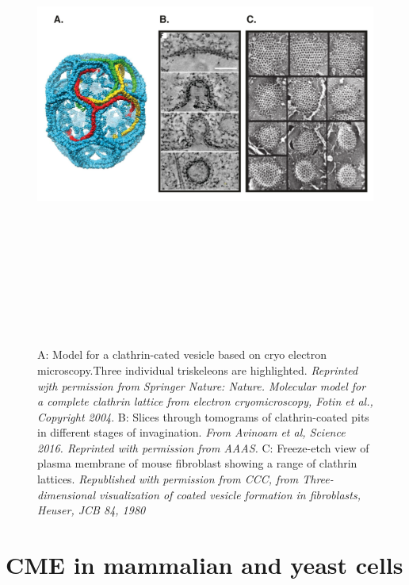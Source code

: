 \begin{figure}[H]
\centering
	\includegraphics[width=13cm, height=16cm, keepaspectratio]{figures/intro/clathrin2}
	\caption[Endocytic pathways in cells]
	{ A: Model for a clathrin-cated vesicle based on cryo electron microscopy.Three individual triskeleons are highlighted. \textit{Reprinted wjth permission from Springer Nature: Nature. Molecular model for a complete clathrin lattice from electron cryomicroscopy,  Fotin et al., Copyright 2004}.
		B:   Slices through tomograms of clathrin-coated pits in different stages of invagination. \textit{From Avinoam et al, Science 2016. Reprinted with permission from AAAS.}
		C: Freeze-etch view of plasma membrane of mouse fibroblast showing a range of clathrin lattices. \textit{Republished with permission from CCC, from Three-dimensional visualization of coated vesicle formation in fibroblasts, Heuser, JCB 84, 1980 }
		\label{intro_clathrin}}
\end{figure}

	
\section{CME in mammalian and yeast cells }
